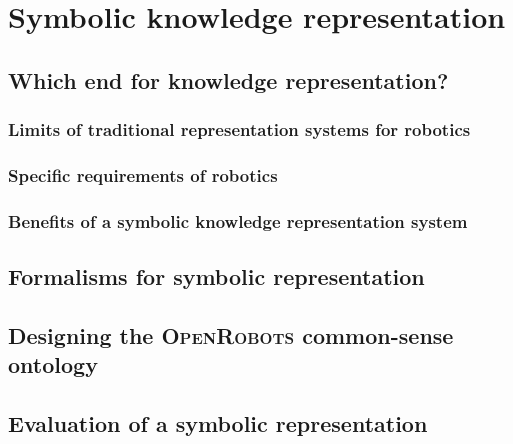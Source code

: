 \chapter{Symbolic knowledge representation}

\section{Which end for knowledge representation?}
\label{sect|krs-purpose}

\subsection{Limits of traditional representation systems for robotics}
\label{subssect|limits}

\subsection{Specific requirements of robotics}
\label{subssect|robotics-specifics}

\subsection{Benefits of a symbolic knowledge representation system}
\label{subssect|krs-benefits}

\section{Formalisms for symbolic representation}
\label{sect|formalisms}

\section{Designing the \textsc{OpenRobots} common-sense ontology}
\label{sect|commonsense-design}

\section{Evaluation of a symbolic representation }
\label{sect|krs-evaluation}

